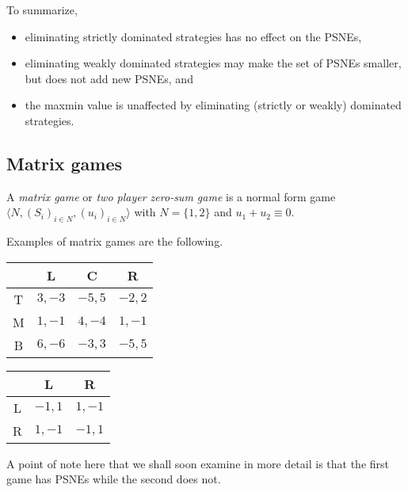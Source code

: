 	To summarize,
	\begin{itemize}
		\item eliminating strictly dominated strategies has no effect on the PSNEs,
		\item eliminating weakly dominated strategies may make the set of PSNEs smaller, but does not add new PSNEs, and
		\item the maxmin value is unaffected by eliminating (strictly or weakly) dominated strategies.
	\end{itemize}

\subsection{Matrix games}

	\begin{fdef}
		A \emph{matrix game} or \emph{two player zero-sum game} is a normal form game $\langle N , (S_i)_{i \in N} , (u_i)_{i \in N} \rangle$ with $N = \{1,2\}$ and $u_1 + u_2 \equiv 0$.
	\end{fdef}

	\begin{fex}
		\label{ex: matrix game}
		Examples of matrix games are the following.

		\begin{center}
		\begin{tabular}{|c||c|c|c|}
			\hline
			& \textsf{L} & \textsf{C} & \textsf{R} \\ \hline \hline
			\textsf{T} & $3,-3$ & $-5,5$ & $-2,2$ \\ \hline
			\textsf{M} & $1,-1$ & $4,-4$ & $1,-1$ \\ \hline
			\textsf{B} & $6,-6$ & $-3,3$ & $-5,5$ \\ \hline
		\end{tabular}
		\end{center}

		\begin{center}
		\begin{tabular}{|c||c|c|}
			\hline
			& \textsf{L} & \textsf{R} \\ \hline\hline
			\textsf{L} & $-1,1$ & $1,-1$ \\ \hline
			\textsf{R} & $1,-1$ & $-1,1$ \\ \hline
		\end{tabular}
		\end{center}

		A point of note here that we shall soon examine in more detail is that the first game has PSNEs while the second does not.
	\end{fex}

